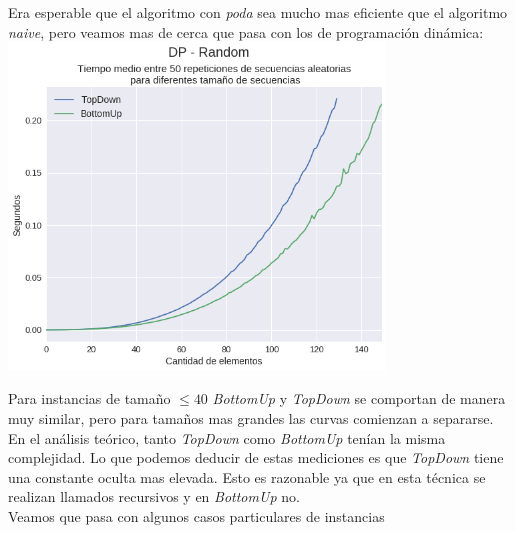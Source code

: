 Era esperable que el algoritmo con \textit{poda} sea mucho mas eficiente que el algoritmo \textit{naive}, pero veamos mas de cerca que pasa con los de programación dinámica: \\

{\centering
  \includegraphics[width=0.75\textwidth]{informe/img/experimentos/dp-random.png} \\
}

Para instancias de tamaño $\leq 40$ \textit{BottomUp} y \textit{TopDown} se comportan de manera muy similar, pero para tamaños mas grandes las curvas comienzan a separarse. \\

En el análisis teórico, tanto \textit{TopDown} como \textit{BottomUp} tenían la misma complejidad. Lo que podemos deducir de estas mediciones es que \textit{TopDown} tiene una constante oculta mas elevada. Esto es razonable ya que en esta técnica se realizan llamados recursivos y en \textit{BottomUp} no. \\

Veamos que pasa con algunos casos particulares de instancias

